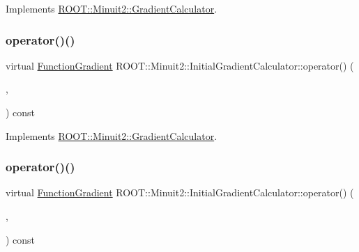 Implements \mbox{\hyperlink{classROOT_1_1Minuit2_1_1GradientCalculator_a1809c1e8a89d32aabf7835e9690c2916}{R\+O\+O\+T\+::\+Minuit2\+::\+Gradient\+Calculator}}.

\mbox{\label{classROOT_1_1Minuit2_1_1InitialGradientCalculator_a673e891a98df0e4a4f71442ab61084bb}} 
\subsubsection{\texorpdfstring{operator()()}{operator()()}\hspace{0.1cm}{\footnotesize\ttfamily [5/6]}}
{\footnotesize\ttfamily virtual \mbox{\hyperlink{classROOT_1_1Minuit2_1_1FunctionGradient}{Function\+Gradient}} R\+O\+O\+T\+::\+Minuit2\+::\+Initial\+Gradient\+Calculator\+::operator() (\begin{DoxyParamCaption}\item[{const \mbox{\hyperlink{classROOT_1_1Minuit2_1_1MinimumParameters}{Minimum\+Parameters}} \&}]{,  }\item[{const \mbox{\hyperlink{classROOT_1_1Minuit2_1_1FunctionGradient}{Function\+Gradient}} \&}]{ }\end{DoxyParamCaption}) const\hspace{0.3cm}{\ttfamily [virtual]}}



Implements \mbox{\hyperlink{classROOT_1_1Minuit2_1_1GradientCalculator_a1809c1e8a89d32aabf7835e9690c2916}{R\+O\+O\+T\+::\+Minuit2\+::\+Gradient\+Calculator}}.

\mbox{\label{classROOT_1_1Minuit2_1_1InitialGradientCalculator_a673e891a98df0e4a4f71442ab61084bb}} 
\subsubsection{\texorpdfstring{operator()()}{operator()()}\hspace{0.1cm}{\footnotesize\ttfamily [6/6]}}
{\footnotesize\ttfamily virtual \mbox{\hyperlink{classROOT_1_1Minuit2_1_1FunctionGradient}{Function\+Gradient}} R\+O\+O\+T\+::\+Minuit2\+::\+Initial\+Gradient\+Calculator\+::operator() (\begin{DoxyParamCaption}\item[{const \mbox{\hyperlink{classROOT_1_1Minuit2_1_1MinimumParameters}{Minimum\+Parameters}} \&}]{,  }\item[{const \mbox{\hyperlink{classROOT_1_1Minuit2_1_1FunctionGradient}{Function\+Gradient}} \&}]{ }\end{DoxyParamCaption}) const\hspace{0.3cm}{\ttfamily [virtual]}}



